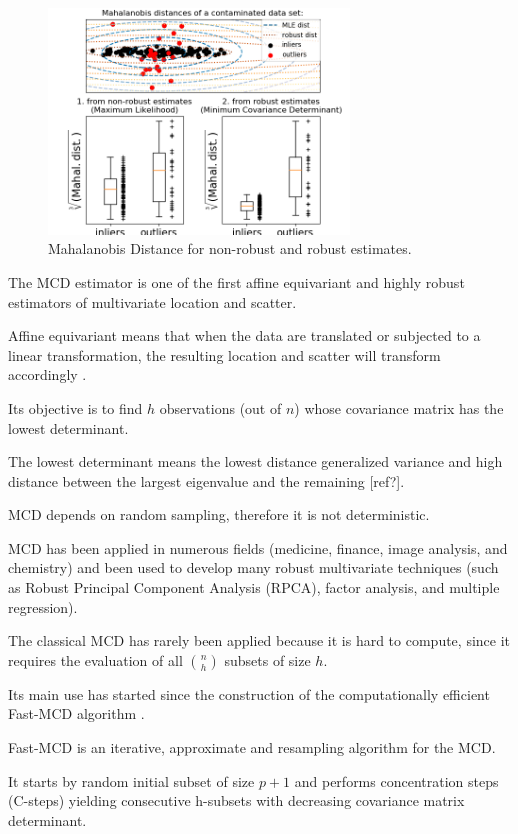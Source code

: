 \documentclass[review]{elsarticle}
\begin{document}
\begin{figure}[h!]
     \centering
     \includegraphics[width=8cm]{figures/mahalanobis_distances01.png}
     \caption{Mahalanobis Distance for non-robust and robust estimates.}
     \label{fig:fig05}
\end{figure}

The MCD estimator is one of the first affine equivariant and highly robust estimators of multivariate location and scatter.
		
Affine equivariant means that when the data are translated or subjected to a linear transformation, the resulting location and scatter will transform accordingly \cite{rousseeuw1984least,rousseeuw1999fast}.

Its objective is to find $h$ observations (out of $n$) whose covariance matrix has the lowest determinant.

The lowest determinant means the lowest distance generalized variance and high distance between the largest eigenvalue and the remaining [ref?].

MCD depends on random sampling, therefore it is not deterministic.

MCD has been applied in numerous fields (medicine, finance, image analysis, and chemistry) and been used to develop many robust multivariate techniques (such as Robust Principal Component Analysis (RPCA), factor analysis, and multiple regression).

The classical MCD has rarely been applied because it is hard to compute, since it requires the evaluation of all $\binom{n}{h}$ subsets of size $h$. %

Its main use has started since the construction of the computationally efficient Fast-MCD algorithm \cite{rousseeuw1999fast}.

Fast-MCD is an iterative, approximate and resampling algorithm for the MCD.

It starts by random initial subset of size $p+1$ and performs concentration steps (C-steps) yielding consecutive h-subsets with decreasing covariance matrix determinant.
\end{document}
